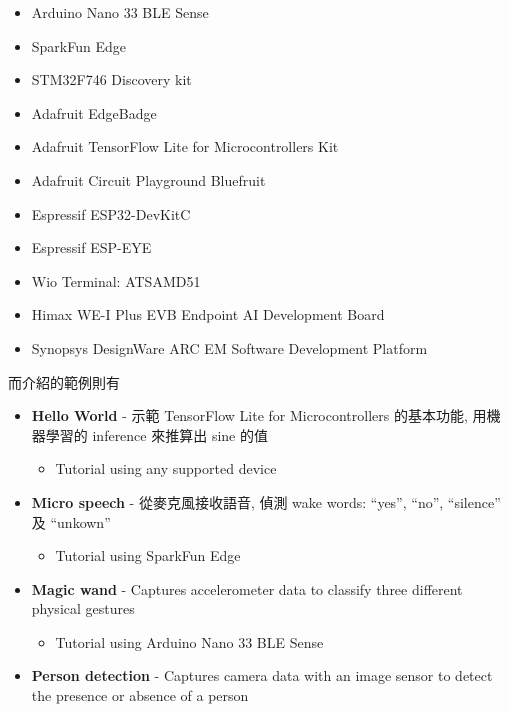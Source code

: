\documentclass[
]{book}
\providecommand{\tightlist}{%
  \setlength{\itemsep}{0pt}\setlength{\parskip}{0pt}}
\begin{document}
\begin{itemize}
\tightlist
\item
  Arduino Nano 33 BLE Sense\\
\item
  SparkFun Edge\\
\item
  STM32F746 Discovery kit\\
\item
  Adafruit EdgeBadge\\
\item
  Adafruit TensorFlow Lite for Microcontrollers Kit\\
\item
  Adafruit Circuit Playground Bluefruit\\
\item
  Espressif ESP32-DevKitC\\
\item
  Espressif ESP-EYE\\
\item
  Wio Terminal: ATSAMD51\\
\item
  Himax WE-I Plus EVB Endpoint AI Development Board\\
\item
  Synopsys DesignWare ARC EM Software Development Platform
\end{itemize}

而介紹的範例則有

\begin{itemize}
\tightlist
\item
  \textbf{Hello World} - 示範 TensorFlow Lite for Microcontrollers 的基本功能, 用機器學習的 inference 來推算出 sine 的值

  \begin{itemize}
  \tightlist
  \item
    Tutorial using any supported device\\
  \end{itemize}
\item
  \textbf{Micro speech} - 從麥克風接收語音, 偵測 wake words: ``yes'', ``no'', ``silence'' 及 ``unkown''

  \begin{itemize}
  \tightlist
  \item
    Tutorial using SparkFun Edge\\
  \end{itemize}
\item
  \textbf{Magic wand} - Captures accelerometer data to classify three different physical gestures

  \begin{itemize}
  \tightlist
  \item
    Tutorial using Arduino Nano 33 BLE Sense\\
  \end{itemize}
\item
  \textbf{Person detection} - Captures camera data with an image sensor to detect the presence or absence of a person
\end{itemize}
\end{document}
